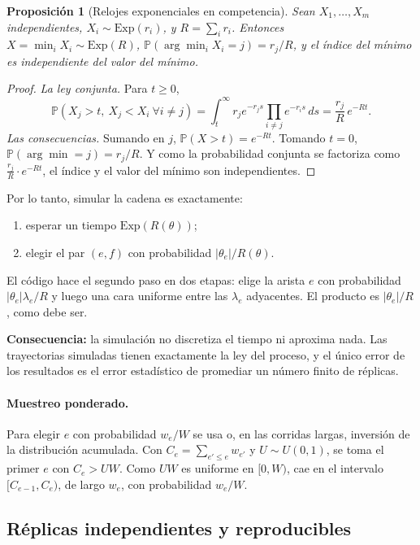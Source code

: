 \documentclass[11pt,a4paper]{article}
\theoremstyle{plain}
\newtheorem{proposicion}{Proposición}[section]
\theoremstyle{remark}
\newcommand{\fn}[1]{\texttt{\detokenize{#1}}}
\begin{document}
\begin{proposicion}[Relojes exponenciales en competencia]\label{prop:gillespie}
Sean $X_1,\dots,X_m$ independientes, $X_i\sim\mathrm{Exp}(r_i)$, y $R=\sum_ir_i$. Entonces $X=\min_iX_i\sim\mathrm{Exp}(R)$, $\mathbb{P}(\arg\min_iX_i=j)=r_j/R$, y el índice del mínimo es independiente del valor del mínimo.
\end{proposicion}

\begin{proof}
\textit{La ley conjunta.} Para $t\ge0$,
\[
\mathbb{P}(X_j>t,\ X_j<X_i\ \forall i\ne j)=\int_t^\infty r_je^{-r_js}\prod_{i\ne j}e^{-r_is}\,ds=\frac{r_j}{R}\,e^{-Rt}.
\]
\textit{Las consecuencias.} Sumando en $j$, $\mathbb{P}(X>t)=e^{-Rt}$. Tomando $t=0$, $\mathbb{P}(\arg\min=j)=r_j/R$. Y como la probabilidad conjunta se factoriza como $\frac{r_j}{R}\cdot e^{-Rt}$, el índice y el valor del mínimo son independientes.
\end{proof}

\noindent Por lo tanto, simular la cadena es exactamente:
\begin{enumerate}[nosep]
  \item esperar un tiempo $\mathrm{Exp}(R(\theta))$;
  \item elegir el par $(e,f)$ con probabilidad $|\theta_e|/R(\theta)$.
\end{enumerate}
El código hace el segundo paso en dos etapas: elige la arista $e$ con probabilidad $|\theta_e|\lambda_e/R$ y luego una cara uniforme entre las $\lambda_e$ adyacentes. El producto es $|\theta_e|/R$, como debe ser.

\noindent\textbf{Consecuencia:} la simulación no discretiza el tiempo ni aproxima nada. Las trayectorias simuladas tienen exactamente la ley del proceso, y el único error de los resultados es el error estadístico de promediar un número finito de réplicas.

\paragraph{Muestreo ponderado.} Para elegir $e$ con probabilidad $w_e/W$ se usa \fn{rng.choice(p=w/W)} o, en las corridas largas, inversión de la distribución acumulada. Con $C_e=\sum_{e'\le e}w_{e'}$ y $U\sim U(0,1)$, se toma el primer $e$ con $C_e>UW$. Como $UW$ es uniforme en $[0,W)$, cae en el intervalo $[C_{e-1},C_e)$, de largo $w_e$, con probabilidad $w_e/W$.

\subsection{Réplicas independientes y reproducibles}
\end{document}
